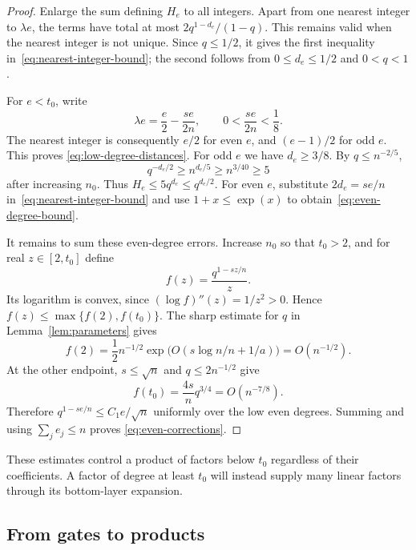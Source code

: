 \begin{proof}
Enlarge the sum defining $H_e$ to all integers.  Apart from one nearest
integer to $\lambda e$, the terms have total at most
$2q^{1-d_e}/(1-q)$.  This remains valid when the nearest integer is
not unique.  Since $q\le1/2$, it gives the first inequality
in~\eqref{eq:nearest-integer-bound}; the second follows from
$0\le d_e\le1/2$ and $0<q<1$.

For $e<t_0$, write
\[
 \lambda e=\frac e2-\frac{se}{2n},
 \qquad 0<\frac{se}{2n}<\frac18.
\]
The nearest integer is consequently $e/2$ for even $e$, and
$(e-1)/2$ for odd $e$.  This proves
\eqref{eq:low-degree-distances}.  For odd $e$ we have $d_e\ge3/8$.
By $q\le n^{-2/5}$,
\[
 q^{-d_e/2}\ge n^{d_e/5}\ge n^{3/40}\ge5
\]
after increasing $n_0$.  Thus
$H_e\le5q^{d_e}\le q^{d_e/2}$.  For even $e$, substitute
$2d_e=se/n$ in~\eqref{eq:nearest-integer-bound} and use
$1+x\le\exp(x)$ to obtain~\eqref{eq:even-degree-bound}.

It remains to sum these even-degree errors.  Increase $n_0$ so that
$t_0>2$, and for real $z\in[2,t_0]$ define
\[
 f(z)=\frac{q^{1-sz/n}}{z}.
\]
Its logarithm is convex, since $(\log f)''(z)=1/z^2>0$.
Hence $f(z)\le\max\{f(2),f(t_0)\}$.  The sharp estimate for $q$ in
Lemma~\ref{lem:parameters} gives
\[
 f(2)
 =\frac12 n^{-1/2}
   \exp\bigl(O(s\log n/n+1/a)\bigr)
 =O(n^{-1/2}).
\]
At the other endpoint, $s\le\sqrt n$ and $q\le2n^{-1/2}$ give
\[
 f(t_0)=\frac{4s}{n}q^{3/4}=O(n^{-7/8}).
\]
Therefore $q^{1-se/n}\le C_1e/\sqrt n$ uniformly over the low even
degrees.  Summing and using $\sum_j e_j\le n$ proves
\eqref{eq:even-corrections}.
\end{proof}

These estimates control a product of factors below $t_0$ regardless
of their coefficients.  A factor of degree at least $t_0$ will instead
supply many linear factors through its bottom-layer expansion.

\subsection{From gates to products}

